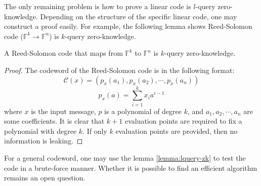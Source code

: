 The only remaining problem is how to prove a linear code is $l$-query zero-knowledge. Depending on the structure of the specific linear code, one may construct a proof easily. For example, the following lemma shows Reed-Solomon code ($\mathbb{F}^k \rightarrow \mathbb{F}^n$) is $k$-query zero-knowledge.

\begin{lemma}
\label{lemma:rscode-kzk}

A Reed-Solomon code that maps from $\mathbb{F}^k$ to $\mathbb{F}^n$ is $k$-query zero-knowledge.

\end{lemma}
\begin{proof}

The codeword of the Reed-Solomon code is in the following format:
$$
\mathcal{C}(x) = 
(
p_x(a_1), p_x(a_2), \cdots, p_x(a_n)
)
$$
$$
p_x(a) = \sum_{i=1}^k x_i a^{i-1}
$$
where $x$ is the input message, $p$ is a polynomial of degree $k$, and $a_1, a_2, \cdots, a_n$ are some coefficients.
It is clear that $k+1$ evaluation points are required to fix a polynomial with degree $k$. If only $k$ evaluation points are provided, then no information is leaking.

\end{proof}

For a general codeword, one may use the lemma \ref{lemma:lquery-zk} to test the code in a brute-force manner. Whether it is possible to find an efficient algorithm remains an open question.